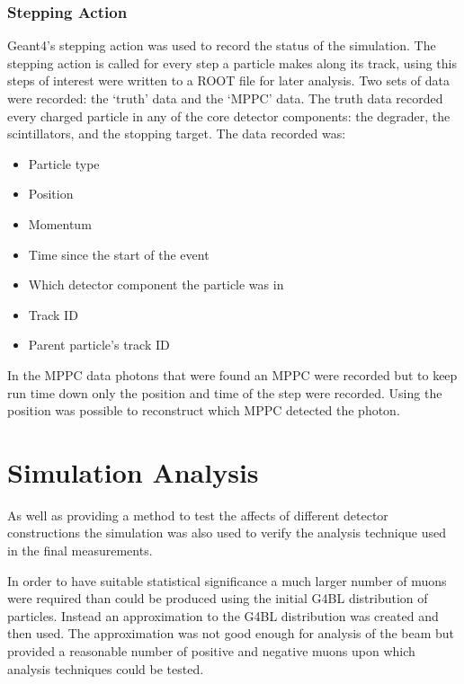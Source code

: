 \subsubsection{Stepping Action} %
\label{sub:stepping_action}
Geant4's stepping action was used to record the status of the simulation. The stepping action is called for every step a particle makes along its track, using this steps of interest were written to a ROOT file for later analysis. Two sets of data were recorded: the `truth' data and the `MPPC' data. The truth data recorded every charged particle in any of the core detector components: the degrader, the scintillators, and the stopping target. The data recorded was:
\begin{itemize}
  \item Particle type
  \item Position
  \item Momentum
  \item Time since the start of the event
  \item Which detector component the particle was in
  \item Track ID
  \item Parent particle's track ID
\end{itemize}

In the MPPC data photons that were found an MPPC were recorded but to keep run time down only the position and time of the step were recorded. Using the position was possible to reconstruct which MPPC detected the photon.

\section{Simulation Analysis} %
\label{cha:simulation_analysis}

As well as providing a method to test the affects of different detector constructions the simulation was also used to verify the analysis technique used in the final measurements. 

In order to have suitable statistical significance a much larger number of muons were required than could be produced using the initial G4BL distribution of particles. Instead an approximation to the G4BL distribution was created and then used. The approximation was not good enough for analysis of the beam but provided a reasonable number of positive and negative muons upon which analysis techniques could be tested. 

